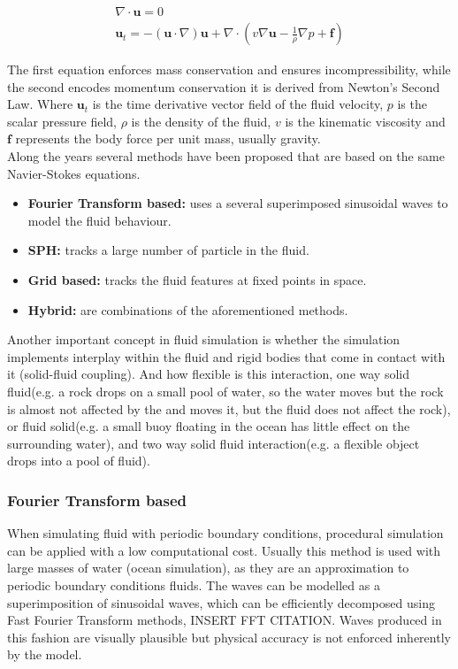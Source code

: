 \documentclass[11pt]{report}
\begin{document}
\begin{gather}
\label{eq:navierStokes1}
\nabla \cdot \mathbf{u} = 0\\
\label{eq:navierStokes2}
\mathbf{u}_t = -(\mathbf{u} \cdot \nabla)\mathbf{u} + \nabla \cdot ( v \nabla \mathbf{u} - \frac{1}{\rho} \nabla p + \mathbf{f} )
\end{gather}

The first equation enforces mass conservation and ensures incompressibility, while the second encodes momentum conservation it is derived from Newton's Second Law.
Where $\mathbf{u}_t$ is the time derivative vector field of the fluid velocity, $p$  is the scalar pressure field, $\rho$ is the density of the fluid, $v$ is the kinematic viscosity and $\mathbf{f}$ represents the body force per unit mass, usually gravity.\\

Along the years several methods have been proposed that are based on the same Navier-Stokes equations.

\begin{itemize}
\item \textbf{Fourier Transform based:} uses a several superimposed sinusoidal waves to model the fluid behaviour. 
\item \textbf{SPH:} tracks a large number of particle in the fluid.
\item \textbf{Grid based:} tracks the fluid features at fixed points in space.
\item \textbf{Hybrid:} are combinations of the aforementioned methods.
\end{itemize}

Another important concept in fluid simulation is whether the simulation implements interplay within the fluid and rigid bodies that come in contact with it (solid-fluid coupling).
And how flexible is this interaction, one way solid fluid(e.g. a rock drops on a small pool of water, so the water moves but the rock is almost not affected by the  and moves it, but the fluid does not affect the rock), or fluid solid(e.g. a small buoy floating in the ocean has little effect on the surrounding water), and two way solid fluid interaction(e.g. a flexible object drops into a pool of fluid).

\subsubsection{Fourier Transform based}

When simulating fluid with periodic boundary conditions, procedural simulation can be applied with a low computational cost.
Usually this method is used with large masses of water (ocean simulation), as they are an approximation to periodic boundary conditions fluids.
The waves can be modelled as a superimposition of sinusoidal waves, which can be efficiently decomposed using Fast Fourier Transform methods, INSERT FFT CITATION.
Waves produced in this fashion are visually plausible but physical accuracy is not enforced inherently by the model.\\
\end{document}
